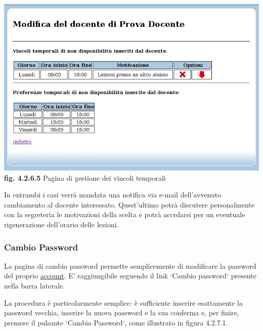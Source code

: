 \documentclass[11pt,a4paper]{article}
\begin{document}
\bigskip
\begin{center}
	\includegraphics[scale=0.5]{images/gestione_vincoli_docenti.jpg}\\
	\textbf{fig. 4.2.6.5} Pagina di gestione dei vincoli temporali\\
\end{center}
\bigskip

In entrambi i casi verrà mandata una notifica via e-mail dell'avvenuto cambiamento al docente interessato. Quest'ultimo potrà discutere personalmente con la segreteria le motivazioni della scelta e potrà accrdarsi per un eventuale rigenerazione dell'orario delle lezioni.
\subsubsection{Cambio Password}
La pagina di cambio password permette semplicemente di modificare la password del proprio \underline{account}. E' raggiungibile seguendo il link `Cambio password` presente nella barra laterale.

La procedura è particolarmente semplice: è sufficiente inserire esattamente la password vecchia, inserire la nuova password e la sua conferma e, per finire, premere il pulsante `Cambia Password`, come illustrato in figura 4.2.7.1.
\end{document}
